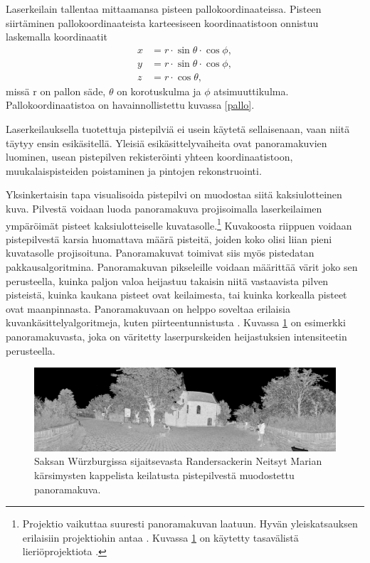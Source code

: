 Laserkeilain tallentaa mittaamansa pisteen pallokoordinaateissa. Pisteen siirtäminen pallokoordinaateista karteesiseen koordinaatistoon onnistuu laskemalla koordinaatit 
\begin{equation}
    \begin{split}
        x&=r \cdot \sin \theta \cdot \cos \phi,\\ 
        y&=r \cdot \sin \theta \cdot \cos \phi,\\
        z&=r \cdot \cos \theta,    
    \end{split}
\end{equation}
missä r on pallon säde, $\theta$ on korotuskulma ja $\phi$ atsimuuttikulma. Pallokoordinaatistoa on havainnollistettu kuvassa \ref{pallo}.

Laserkeilauksella tuotettuja pistepilviä ei usein käytetä sellaisenaan, vaan niitä täytyy ensin esikäsitellä. Yleisiä esikäsittelyvaiheita ovat panoramakuvien luominen, usean pistepilven rekisteröinti yhteen koordinaatistoon, muukalaispisteiden poistaminen ja pintojen rekonstruointi.

Yksinkertaisin tapa visualisoida pistepilvi on muodostaa siitä kaksiulotteinen kuva. Pilvestä voidaan luoda panoramakuva projisoimalla laserkeilaimen ympäröimät pisteet kaksiulotteiselle kuvatasolle.\footnote{Projektio vaikuttaa suuresti panoramakuvan laatuun. Hyvän yleiskatsauksen erilaisiin projektiohin antaa \cite{proj}. Kuvassa \ref{img:pano} on käytetty tasavälistä lieriöprojektiota .} Kuvakoosta riippuen voidaan pistepilvestä karsia huomattava määrä pisteitä, joiden koko olisi liian pieni kuvatasolle projisoituna. Panoramakuvat toimivat siis myös pistedatan pakkausalgoritmina. Panoramakuvan pikseleille voidaan määrittää värit joko sen perusteella, kuinka paljon valoa heijastuu takaisin niitä vastaavista pilven pisteistä, kuinka kaukana pisteet ovat keilaimesta, tai kuinka korkealla pisteet ovat maanpinnasta. Panoramakuvaan on helppo soveltaa erilaisia kuvankäsittelyalgoritmeja, kuten piirteentunnistusta . Kuvassa \ref{img:pano} on esimerkki panoramakuvasta, joka on väritetty laserpurskeiden heijastuksien intensiteetin perusteella.

\begin{figure}
    \centering
    \includegraphics[width=\textwidth]{img/pano.png}
    \caption{Saksan Würzburgissa sijaitsevasta Randersackerin Neitsyt Marian kärsimysten kappelista keilatusta pistepilvestä muodostettu panoramakuva.}
    \label{img:pano}
\end{figure}

